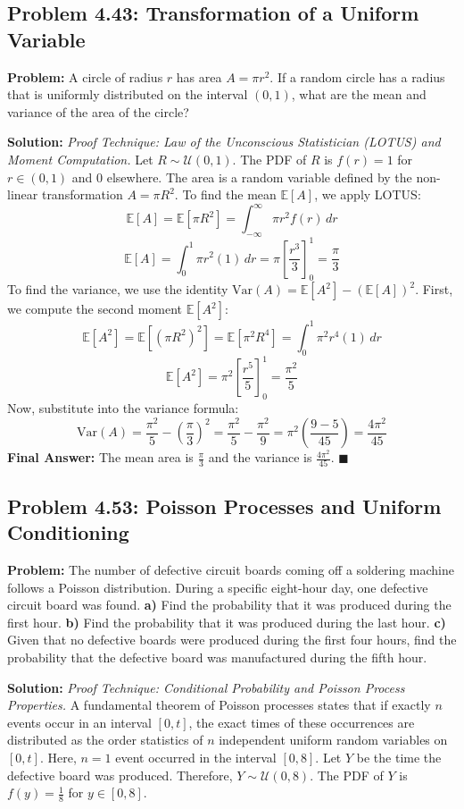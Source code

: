 \documentclass[11pt, a4paper]{article}
\theoremstyle{definition}
\theoremstyle{remark}
\newcommand{\E}{\mathbb{E}}
\begin{document}
\subsection{Problem 4.43: Transformation of a Uniform Variable}
\textbf{Problem:} A circle of radius $r$ has area $A = \pi r^2$. If a random circle has a radius that is uniformly distributed on the interval $(0, 1)$, what are the mean and variance of the area of the circle?

\textbf{Solution:}
\textit{Proof Technique: Law of the Unconscious Statistician (LOTUS) and Moment Computation.}
Let $R \sim \mathcal{U}(0,1)$. The PDF of $R$ is $f(r) = 1$ for $r \in (0,1)$ and $0$ elsewhere.
The area is a random variable defined by the non-linear transformation $A = \pi R^2$.
To find the mean $\E[A]$, we apply LOTUS:
\[ \E[A] = \E[\pi R^2] = \int_{-\infty}^{\infty} \pi r^2 f(r) \, dr \]
\[ \E[A] = \int_{0}^{1} \pi r^2 (1) \, dr = \pi \left[ \frac{r^3}{3} \right]_{0}^{1} = \frac{\pi}{3} \]
To find the variance, we use the identity $\text{Var}(A) = \E[A^2] - (\E[A])^2$.
First, we compute the second moment $\E[A^2]$:
\[ \E[A^2] = \E[(\pi R^2)^2] = \E[\pi^2 R^4] = \int_{0}^{1} \pi^2 r^4 (1) \, dr \]
\[ \E[A^2] = \pi^2 \left[ \frac{r^5}{5} \right]_{0}^{1} = \frac{\pi^2}{5} \]
Now, substitute into the variance formula:
\[ \text{Var}(A) = \frac{\pi^2}{5} - \left( \frac{\pi}{3} \right)^2 = \frac{\pi^2}{5} - \frac{\pi^2}{9} = \pi^2 \left( \frac{9 - 5}{45} \right) = \frac{4\pi^2}{45} \]
\textbf{Final Answer:} The mean area is $\frac{\pi}{3}$ and the variance is $\frac{4\pi^2}{45}$.
$\blacksquare$

\subsection{Problem 4.53: Poisson Processes and Uniform Conditioning}
\textbf{Problem:} The number of defective circuit boards coming off a soldering machine follows a Poisson distribution. During a specific eight-hour day, one defective circuit board was found.
\textbf{a)} Find the probability that it was produced during the first hour.
\textbf{b)} Find the probability that it was produced during the last hour.
\textbf{c)} Given that no defective boards were produced during the first four hours, find the probability that the defective board was manufactured during the fifth hour.

\textbf{Solution:}
\textit{Proof Technique: Conditional Probability and Poisson Process Properties.}
A fundamental theorem of Poisson processes states that if exactly $n$ events occur in an interval $[0, t]$, the exact times of these occurrences are distributed as the order statistics of $n$ independent uniform random variables on $[0, t]$.
Here, $n = 1$ event occurred in the interval $[0, 8]$. Let $Y$ be the time the defective board was produced. Therefore, $Y \sim \mathcal{U}(0, 8)$.
The PDF of $Y$ is $f(y) = \frac{1}{8}$ for $y \in [0, 8]$.
\end{document}
